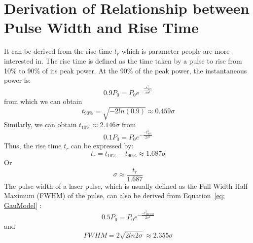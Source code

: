 \chapter{Derivation of Relationship between Pulse Width and Rise Time}
It can be derived from the rise time $t_r$ which is parameter people are more interested in. The rise time is defined as the time taken by a pulse to rise from 10\% to 90\% of its peak power. At the 90\% of the peak power, the instantaneous power is:
\begin{equation}
0.9P_0 = P_0e^{-\frac{-t_{90\%}^2}{2\sigma^2}}
\end{equation}
from which we can obtain
\begin{equation}
t_{90\%}=\sqrt{-2ln(0.9)} \approx0.459\sigma
\end{equation}
Similarly, we can obtain $t_{10\%} \approx2.146\sigma$ from
\begin{equation}
0.1P_0 = P_0e^{-\frac{-t_{10\%}^2}{2\sigma^2}}
\end{equation}
Thus, the rise time $t_r$ can be expressed by:
\begin{equation}
t_r = t_{10\%}-t_{90\%}\approx1.687\sigma
\end{equation}
Or
\begin{equation}
\sigma\approx\frac{t_r}{1.687}
\end{equation}
The pulse width of a laser pulse, which is usually defined as the Full Width Half Maximum (FWHM) of the pulse, can also be derived from Equation~\ref{eq: GauModel} :
\begin{equation}
0.5P_0 = P_0e^{-\frac{-t_{{\mathit{FWHM}}}^2}{2\sigma^2}}
\end{equation}
and
\begin{equation}
{\mathit{FWHM}}=2\sqrt{2ln2\sigma}\approx2.355\sigma
\end{equation}
